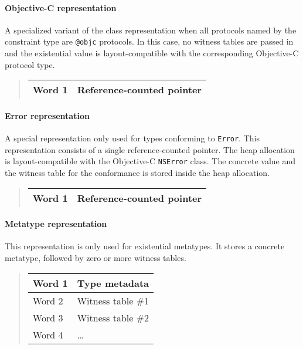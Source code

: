 \documentclass[a4paper,headsepline,bibliography=totoc,toc=flat,fleqn,twoside=semi]{scrbook}
\theoremstyle{definition}
\theoremstyle{definition}
\theoremstyle{definition}
\begin{document}
\paragraph{Objective-C representation} A specialized variant of the class representation when all protocols named by the constraint type are \texttt{@objc} protocols. In this case, no witness tables are passed in and the existential value is layout-compatible with the corresponding Objective-C protocol type.

\begin{quote}
\begin{tabular}{|l|l|}
\hline
Word 1&Reference-counted pointer\\
\hline
\end{tabular}
\end{quote}

\paragraph{Error representation} A special representation only used for types conforming to \texttt{Error}. This representation consists of a single reference-counted pointer. The heap allocation is layout-compatible with the Objective-C \texttt{NSError} class. The concrete value and the witness table for the conformance is stored inside the heap allocation.

\begin{quote}
\begin{tabular}{|l|l|}
\hline
Word 1&Reference-counted pointer\\
\hline
\end{tabular}
\end{quote}

\paragraph{Metatype representation} This representation is only used for existential metatypes. It stores a concrete metatype, followed by zero or more witness tables.

\begin{quote}
\begin{tabular}{|l|l|}
\hline
Word 1&Type metadata\\
\hline
\hline
Word 2&Witness table \#1\\
Word 3&Witness table \#2\\
Word 4&\ldots\\
\hline
\end{tabular}
\end{quote}
\end{document}
